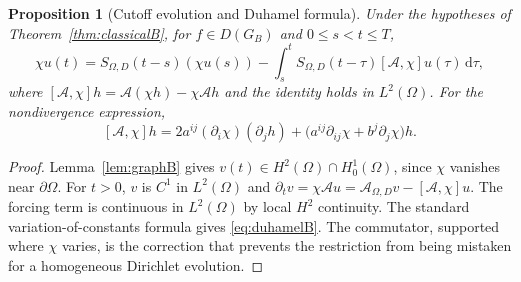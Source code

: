 \documentclass[11pt,a4paper]{article}
\newtheorem{proposition}[theorem]{Proposition}
\theoremstyle{definition}\newtheorem{definition}{Definition}[section]\newtheorem{example}[theorem]{Example}
\theoremstyle{remark}\newtheorem{remark}[theorem]{Remark}\newtheorem{remarkSix}{Remark}[section]
\newcommand{\dd}{\,\mathrm d}
\newcommand{\cA}{\mathcal A}
\begin{document}
\begin{proposition}[Cutoff evolution and Duhamel formula]\label{prop:duhamelB}
Under the hypotheses of Theorem~\ref{thm:classicalB}, for $f\in D(G_B)$ and $0\le s<t\le T$,
\begin{equation}\label{eq:duhamelB}
\boxed{\quad
\chi u(t)=S_{\Omega,D}(t-s)(\chi u(s))
-\int_s^t S_{\Omega,D}(t-\tau)[\cA,\chi]u(\tau)\dd\tau,
\quad}
\end{equation}
where $[\cA,\chi]h=\cA(\chi h)-\chi\cA h$ and the identity holds in $L^2(\Omega)$. For the nondivergence expression,
\begin{equation}\label{eq:commB}
 [\cA,\chi]h=2a^{ij}(\partial_i\chi)(\partial_jh)
 +\bigl(a^{ij}\partial_{ij}\chi+b^j\partial_j\chi\bigr)h.
\end{equation}
\end{proposition}
\begin{proof}
Lemma~\ref{lem:graphB} gives $v(t)\in H^2(\Omega)\cap H_0^1(\Omega)$, since $\chi$ vanishes near $\partial\Omega$. For $t>0$, $v$ is $C^1$ in $L^2(\Omega)$ and
$\partial_t v=\chi\cA u=\cA_{\Omega,D}v-[\cA,\chi]u$.
The forcing term is continuous in $L^2(\Omega)$ by local $H^2$ continuity. The standard variation-of-constants formula gives \eqref{eq:duhamelB}. The commutator, supported where $\chi$ varies, is the correction that prevents the restriction from being mistaken for a homogeneous Dirichlet evolution.
\end{proof}
\end{document}
